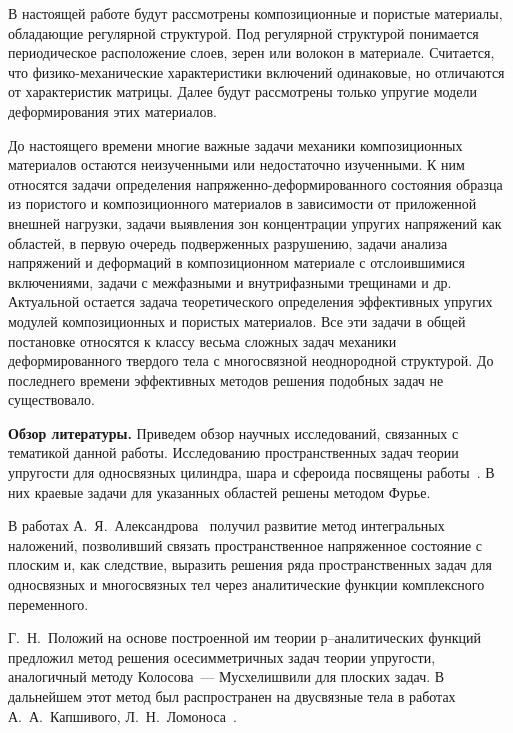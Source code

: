 В настоящей работе будут рассмотрены композиционные и пористые материалы, обладающие регулярной структурой. Под регулярной структурой понимается периодическое расположение слоев, зерен или волокон в материале. Считается, что фи\-зи\-ко-\-ме\-ха\-ни\-че\-ские характеристики включений одинаковые, но отличаются от характеристик матрицы. Далее будут рассмотрены только упругие модели деформирования этих материалов.

До настоящего времени многие важные задачи механики композиционных материалов остаются неизученными или недостаточно изученными. К ним относятся задачи определения напряженно-деформированного состояния образца из пористого и композиционного материалов в зависимости от приложенной внешней нагрузки, задачи выявления зон концентрации упругих напряжений как областей, в первую очередь подверженных разрушению, задачи анализа напряжений и деформаций в композиционном материале с отслоившимися включениями, задачи с межфазными и внутрифазными трещинами и др. Актуальной остается задача теоретического определения эффективных упругих модулей композиционных и пористых материалов. Все эти задачи в общей постановке относятся к классу весьма сложных задач механики деформированного твердого тела с многосвязной неоднородной структурой. До последнего времени эффективных методов решения подобных задач не существовало. 

{\bf Обзор литературы.} 
Приведем обзор научных исследований, связанных с тематикой данной работы. Исследованию пространственных задач теории упругости для односвязных цилиндра, шара и сфероида посвящены работы~\cite{Abramian, Andreev, Valov, Volpert1977, Volpert1967, Gomilko, Grinchenko1965, Grinchenko1967, Grinchenko1985, Grinchenko1978, Lur'e, Podilchuk1967, Podilchuk1984, Prokopov, Tokovyy, Ulitko, Chen1978-1, Chen1978-2, Edwards, Zhong, Zureick1989, Zureick1988, Ambartsumian, Arutynian, Kaufman, Kolesov, Meleshko}. В них краевые задачи для указанных областей решены методом Фурье.

В работах А.~Я.~Александрова~\cite{Aleksandrov1978, Aleksandrov1973} получил развитие метод интегральных наложений, позволивший связать пространственное напряженное состояние с плоским и, как следствие, выразить решения ряда пространственных задач для односвязных и многосвязных тел через аналитические функции комплексного переменного.

Г.~Н.~Положий на основе построенной им теории р–аналитических функций предложил метод решения осесимметричных задач теории упругости, аналогичный методу Колосова~--- Мусхелишвили для плоских задач. В дальнейшем этот метод был распространен на двусвязные тела в работах А.~А.~Капшивого, Л.~Н.~Ломоноса~\cite{Kapshiviy, Lomonos}.

